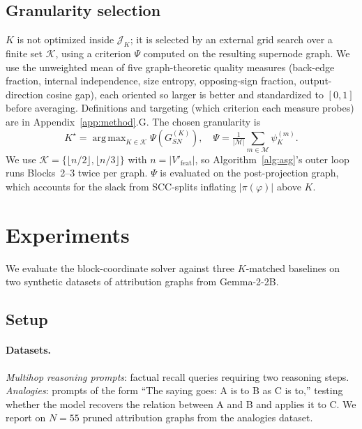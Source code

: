 \documentclass[table, 11pt]{article}
\DeclareMathOperator*{\argmax}{arg\,max}
\begin{document}
\subsection{Granularity selection}\label{sec:k-selection}

$K$ is not optimized inside $\mathcal{J}_K$; it is selected by an
external grid search over a finite set $\mathcal{K}$, using a
criterion $\Psi$ computed on the resulting supernode graph. We use
the unweighted mean of five graph-theoretic quality measures
(back-edge fraction, internal independence, size entropy,
opposing-sign fraction, output-direction cosine gap), each oriented
so larger is better and standardized to $[0,1]$ before averaging.
Definitions and targeting (which criterion each measure probes) are
in Appendix~\ref{app:method}.G. The chosen granularity is
\begin{equation}
K^\star = \argmax_{K \in \mathcal{K}} \Psi(G_{SN}^{(K)}), \quad
\Psi = \tfrac{1}{|\mathcal{M}|}\sum_{m \in \mathcal{M}}\psi^{(m)}_K.
\label{eq:K-star}
\end{equation}
We use $\mathcal{K} = \{\lfloor n/2 \rfloor, \lfloor n/3 \rfloor\}$
with $n = |V'_{\text{feat}}|$, so Algorithm~\ref{alg:asg}'s outer
loop runs Blocks~2--3 twice per graph. $\Psi$ is evaluated on the
post-projection graph, which accounts for the slack from
SCC-splits inflating $|\pi(\varphi)|$ above $K$.

\section{Experiments}\label{sec:exp}

We evaluate the block-coordinate solver against three $K$-matched
baselines on two synthetic datasets of attribution graphs from
Gemma-2-2B.

\subsection{Setup}

\paragraph{Datasets.}
\textit{Multihop reasoning prompts}: factual recall queries requiring
two reasoning steps. \textit{Analogies}: prompts of the form
``The saying goes: A is to B as C is to,'' testing whether the
model recovers the relation between A and B and applies it to C. We
report on $N=55$ pruned attribution graphs from the analogies
dataset.
\end{document}

